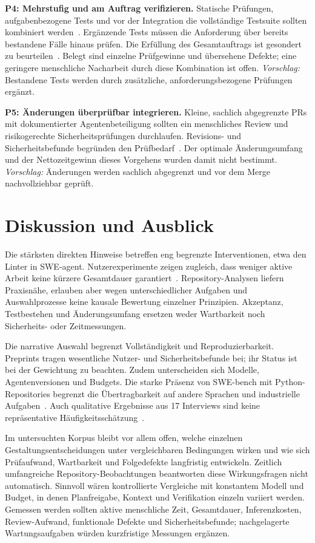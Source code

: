 \documentclass[conference]{IEEEtran}
\begin{document}
\textbf{P4: Mehrstufig und am Auftrag verifizieren.}
Statische Prüfungen, aufgabenbezogene Tests und vor der Integration die vollständige Testsuite sollten kombiniert werden~\cite{yang2024sweagent,wang2026solvedissues}. Ergänzende Tests müssen die Anforderung über bereits bestandene Fälle hinaus prüfen. Die Erfüllung des Gesamtauftrags ist gesondert zu beurteilen~\cite{cemri2025mast}. Belegt sind einzelne Prüfgewinne und übersehene Defekte; eine geringere menschliche Nacharbeit durch diese Kombination ist offen. \emph{Vorschlag:} Bestandene Tests werden durch zusätzliche, anforderungsbezogene Prüfungen ergänzt.

\textbf{P5: Änderungen überprüfbar integrieren.}
Kleine, sachlich abgegrenzte PRs mit dokumentierter Agentenbeteiligung sollten ein menschliches Review und risikogerechte Sicherheitsprüfungen durchlaufen. Revisions- und Sicherheitsbefunde begründen den Prüfbedarf~\cite{watanabe2025agenticprs,sajadi2025patchsecurity}. Der optimale Änderungsumfang und der Nettozeitgewinn dieses Vorgehens wurden damit nicht bestimmt. \emph{Vorschlag:} Änderungen werden sachlich abgegrenzt und vor dem Merge nachvollziehbar geprüft.

\section{Diskussion und Ausblick}
Die stärksten direkten Hinweise betreffen eng begrenzte Interventionen, etwa den Linter in SWE-agent. Nutzerexperimente zeigen zugleich, dass weniger aktive Arbeit keine kürzere Gesamtdauer garantiert~\cite{chen2025codewithme}. Repository-Analysen liefern Praxisnähe, erlauben aber wegen unterschiedlicher Aufgaben und Auswahlprozesse keine kausale Bewertung einzelner Prinzipien. Akzeptanz, Testbestehen und Änderungsumfang ersetzen weder Wartbarkeit noch Sicherheits- oder Zeitmessungen.

Die narrative Auswahl begrenzt Vollständigkeit und Reproduzierbarkeit. Preprints tragen wesentliche Nutzer- und Sicherheitsbefunde bei; ihr Status ist bei der Gewichtung zu beachten. Zudem unterscheiden sich Modelle, Agentenversionen und Budgets. Die starke Präsenz von SWE-bench mit Python-Repositories begrenzt die Übertragbarkeit auf andere Sprachen und industrielle Aufgaben~\cite{jimenez2024swebench,gloaguen2026agentsmd}. Auch qualitative Ergebnisse aus 17 Interviews sind keine repräsentative Häufigkeitsschätzung~\cite{dhanorkar2026oversight}.

Im untersuchten Korpus bleibt vor allem offen, welche einzelnen Gestaltungsentscheidungen unter vergleichbaren Bedingungen wirken und wie sich Prüfaufwand, Wartbarkeit und Folgedefekte langfristig entwickeln. Zeitlich umfangreiche Repository-Beobachtungen beantworten diese Wirkungsfragen nicht automatisch. Sinnvoll wären kontrollierte Vergleiche mit konstantem Modell und Budget, in denen Planfreigabe, Kontext und Verifikation einzeln variiert werden. Gemessen werden sollten aktive menschliche Zeit, Gesamtdauer, Inferenzkosten, Review-Aufwand, funktionale Defekte und Sicherheitsbefunde; nachgelagerte Wartungsaufgaben würden kurzfristige Messungen ergänzen.
\end{document}
